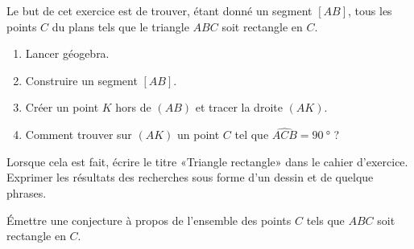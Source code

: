 
\begin{exercice}\label{exosmath-0900}

    Le but de cet exercice est de trouver, étant donné un segment \( [AB]\), tous les points \( C\) du plans tels que le triangle \( ABC\) soit rectangle en \( C\).
    \begin{enumerate}
        \item
            Lancer géogebra.
        \item
            Construire un segment \( [AB]\).
        \item
            Créer un point \( K\) hors de \( (AB)\) et tracer la droite \( (AK)\).
        \item
            Comment trouver sur \( (AK)\) un point \( C\) tel que \( \widehat{ACB}=\SI{90}{\degree}\) ?
    \end{enumerate}

    Lorsque cela est fait, écrire le titre «Triangle rectangle» dans le cahier d'exercice. Exprimer les résultats des recherches sous forme d'un dessin et de quelque phrases. 

    Émettre une conjecture à propos de l'ensemble des points \( C\) tels que \( ABC\) soit rectangle en \( C\).

\end{exercice}
